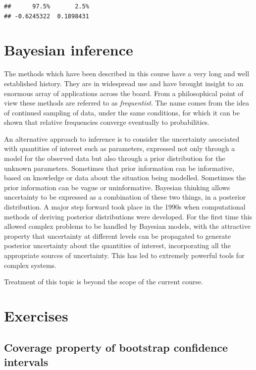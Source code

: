 \documentclass[
]{book}
\begin{document}
\begin{verbatim}
##      97.5%       2.5% 
## -0.6245322  0.1898431
\end{verbatim}

\section{Bayesian inference}\label{bayesian-inference}

The methods which have been described in this course have a very long and well established history. They are in widespread use and have brought insight to an enormous array of applications across the board. From a philosophical point of view these methods are referred to as \emph{frequentist}. The name comes from the idea of continued sampling of data, under the same conditions, for which it can be shown that relative frequencies converge eventually to probabilities.

An alternative approach to inference is to consider the uncertainty associated with quantities of interest such as parameters, expressed not only through a model for the observed data but also through a prior distribution for the unknown parameters. Sometimes that prior information can be informative, based on knowledge or data about the situation being modelled. Sometimes the prior information can be vague or uninformative. Bayesian thinking allows uncertainty to be expressed as a combination of these two things, in a posterior distribution. A major step forward took place in the 1990s when computational methods of deriving posterior distributions were developed. For the first time this allowed complex problems to be handled by Bayesian models, with the attractive property that uncertainty at different levels can be propagated to generate posterior uncertainty about the quantities of interest, incorporating all the appropriate sources of uncertainty. This has led to extremely powerful tools for complex systems.

Treatment of this topic is beyond the scope of the current course.

\section{Exercises}\label{exercises-1}

\subsection{Coverage property of bootstrap confidence intervals}\label{coverage-property-of-bootstrap-confidence-intervals}
\end{document}
